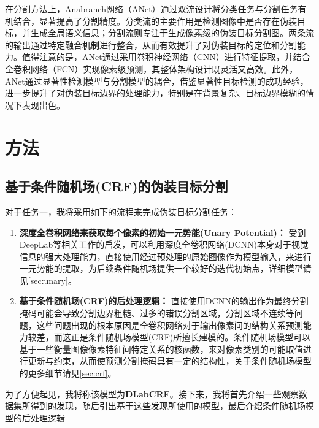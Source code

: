 \documentclass[a4paper,12pt]{ctexart}
\begin{document}
在分割方法上，Anabranch网络\cite{Le2019AnabranchNF}（ANet）通过双流设计将分类任务与分割任务有机结合，显著提高了分割精度。分类流的主要作用是检测图像中是否存在伪装目标，并生成全局语义信息；分割流则专注于生成像素级的伪装目标分割图。两条流的输出通过特定融合机制进行整合，从而有效提升了对伪装目标的定位和分割能力。值得注意的是，ANet通过采用卷积神经网络（CNN）进行特征提取，并结合全卷积网络（FCN）实现像素级预测，其整体架构设计既灵活又高效。此外，ANet通过显著性检测模型与分割模型的耦合，借鉴显著性目标检测的成功经验，进一步提升了对伪装目标边界的处理能力，特别是在背景复杂、目标边界模糊的情况下表现出色。
\section{方法}

\subsection{基于条件随机场(CRF)的伪装目标分割}

对于任务一，我将采用如下的流程来完成伪装目标分割任务：

\begin{enumerate}
    \item \textbf{深度全卷积网络来获取每个像素的初始一元势能(Unary Potential)：} 受到DeepLab\cite{Chen2016DeepLabSI}等相关工作的启发，可以利用深度全卷积网络(DCNN)本身对于视觉信息的强大处理能力，直接使用经过预处理的原始图像作为模型输入，来进行一元势能的提取，为后续条件随机场提供一个较好的迭代初始点，详细模型请见\ref{sec:unary}。
    \item \textbf{基于条件随机场(CRF)的后处理逻辑：} 直接使用DCNN的输出作为最终分割掩码可能会导致分割边界粗糙、过多的错误分割区域，分割区域不连续等问题，这些问题出现的根本原因是全卷积网络对于输出像素间的结构关系预测能力较差，而这正是条件随机场模型(CRF)所擅长建模的。条件随机场模型可以基于一些衡量图像像素特征间特定关系的核函数，来对像素类别的可能取值进行更新与约束，从而使预测分割掩码具有一定的结构性，关于条件随机场模型的更多细节请见\ref{sec:crf}。
\end{enumerate}

为了方便起见，我将称该模型为\textbf{DLabCRF}。接下来，我将首先介绍一些观察数据集所得到的发现，随后引出基于这些发现所使用的模型，最后介绍条件随机场模型的后处理逻辑
\end{document}
